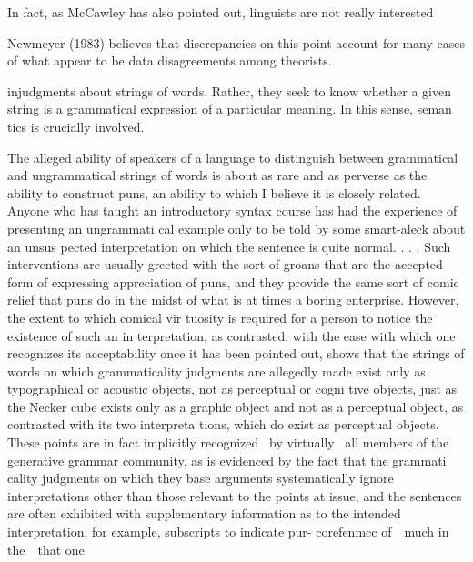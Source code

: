 \begin{styleStandard}
In fact, as McCawley has also pointed out, linguists are not really interested
\end{styleStandard}


\setcounter{listWWNumlxleveli}{14}
\begin{listWWNumlxleveli}
\item 
\begin{styleStandard}
Newmeyer (1983) believes that discrepancies on this point account for many cases of what appear to be data disagreements among theorists.
\end{styleStandard}


\end{listWWNumlxleveli}
\clearpage\setcounter{page}{1}\begin{styleStandard}
injudgments about strings of words. Rather, they seek to know whether a given string is a grammatical expression of a particular meaning. In this sense, seman\- tics is crucially involved.
\end{styleStandard}


\begin{styleStandard}
The alleged ability of speakers of a language to distinguish between {\textquotedbl}grammatical{\textquotedbl} and {\textquotedbl}ungrammatical{\textquotedbl} strings of words is about as rare and as perverse as the ability to construct puns, an ability to which I believe it is closely related. Anyone who has taught an introductory syntax course has had the experience of presenting an {\textquotedbl}ungrammati\- cal{\textquotedbl} example only to be told by some smart-aleck about an unsus\- pected interpretation on which the sentence is quite normal. . . . Such interventions are usually greeted with the sort of groans that are the accepted form of expressing appreciation of puns, and they provide the same sort of comic relief that puns do in the midst of what is at times a boring enterprise. However, the extent to which comical vir\- tuosity is required for a person to notice the existence of such an in\- terpretation, as contrasted. with the ease with which one recognizes its acceptability once it has been pointed out, shows that the strings of words on which grammaticality judgments are allegedly made exist only as typographical or acoustic objects, not as perceptual or cogni\- tive objects, just as the Necker cube exists only as a graphic object and not as a perceptual object, as contrasted with its two interpreta\- tions, which do exist as perceptual objects. These points are in fact implicitly recognized \ by virtually \ all members of the generative grammar community, as is evidenced by the fact that the {\textquotedbl}grammati\- cality judgments{\textquotedbl} on which they base arguments systematically ignore interpretations other than those relevant to the points at issue, and the {\textquotedbl}sentences{\textquotedbl} are often exhibited with supplementary information as to the intended interpretation, for example, subscripts to indicate pur- corefenmcc of\ \ much in the\ \ that one
\end{styleStandard}


